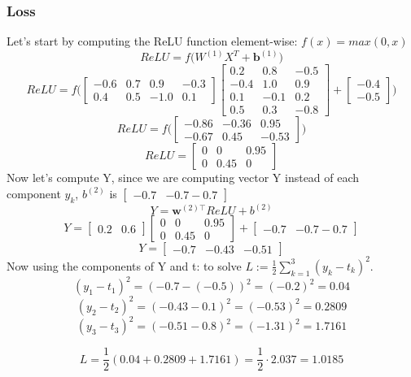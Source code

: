 \documentclass[a4paper,12pt]{article}
\begin{document}
\subsubsection{Loss}
Let's start by computing the ReLU function element-wise: $f(x) = max(0,x)$
$$
ReLU = f\big( W^{(1)} X^T + \mathbf{b}^{(1)}\big)
$$
$$
ReLU = f\big( \begin{bmatrix}
-0.6 & 0.7 & 0.9 & -0.3 \\
0.4 & 0.5 & -1.0 & 0.1
\end{bmatrix}
\begin{bmatrix}
0.2 & 0.8 & -0.5 \\
-0.4 & 1.0 & 0.9 \\
0.1 & -0.1 & 0.2 \\
0.5 & 0.3 & -0.8
\end{bmatrix}
+ \begin{bmatrix} 
-0.4 \\ -0.5 
\end{bmatrix}\big)
$$
$$
ReLU =
f\big(\begin{bmatrix} 
-0.86 & -0.36 & 0.95 \\ 
-0.67 & 0.45 & -0.53 
\end{bmatrix}\big)
$$
$$
ReLU = 
\begin{bmatrix} 
0 & 0 & 0.95 \\ 
0 & 0.45 & 0
\end{bmatrix}
$$
Now let's compute Y, since we are computing vector Y instead of each component $y_k$, $b^{(2)}$ is $\begin{bmatrix} -0.7 & -0.7 -0.7\end{bmatrix}$
$$
Y = \mathbf{w}^{(2) \top} ReLU + b^{(2)}
$$
$$
Y =
\begin{bmatrix} 0.2 & 0.6 \end{bmatrix}
\begin{bmatrix} 
0 & 0 & 0.95 \\ 
0 & 0.45 & 0
\end{bmatrix}
+ \begin{bmatrix} -0.7 & -0.7 -0.7\end{bmatrix}
$$
$$
Y = \begin{bmatrix} -0.7 & -0.43 & -0.51 \end{bmatrix}
$$
Now using the components of Y and t: to solve $L := \frac{1}{2} \sum_{k=1}^3(y_k-t_k)^2.$
$$(y_1 - t_1)^2 = (-0.7 - (-0.5))^2 = (-0.2)^2 = 0.04$$
$$(y_2 - t_2)^2 = (-0.43 - 0.1)^2 = (-0.53)^2 = 0.2809$$
$$(y_3 - t_3)^2 = (-0.51 - 0.8)^2 = (-1.31)^2 = 1.7161$$

$$L = \frac{1}{2} (0.04 + 0.2809 + 1.7161) = \frac{1}{2} \cdot 2.037 = 1.0185$$
\end{document}
